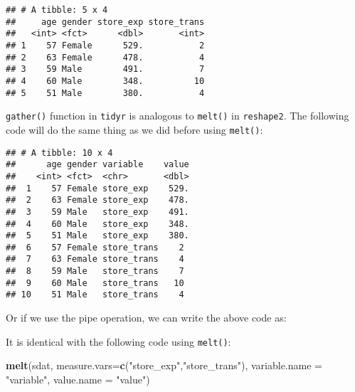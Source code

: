 \documentclass[
]{article}
\newenvironment{Shaded}{\begin{snugshade}}{\end{snugshade}}
\newcommand{\DataTypeTok}[1]{\textcolor[rgb]{0.13,0.29,0.53}{#1}}
\newcommand{\KeywordTok}[1]{\textcolor[rgb]{0.13,0.29,0.53}{\textbf{#1}}}
\newcommand{\NormalTok}[1]{#1}
\newcommand{\OperatorTok}[1]{\textcolor[rgb]{0.81,0.36,0.00}{\textbf{#1}}}
\newcommand{\StringTok}[1]{\textcolor[rgb]{0.31,0.60,0.02}{#1}}
\begin{document}
\begin{verbatim}
## # A tibble: 5 x 4
##     age gender store_exp store_trans
##   <int> <fct>      <dbl>       <int>
## 1    57 Female      529.           2
## 2    63 Female      478.           4
## 3    59 Male        491.           7
## 4    60 Male        348.          10
## 5    51 Male        380.           4
\end{verbatim}

\texttt{gather()} function in \texttt{tidyr} is analogous to
\texttt{melt()} in \texttt{reshape2}. The following code will do the
same thing as we did before using \texttt{melt()}:

\begin{Shaded}
\end{Shaded}

\begin{verbatim}
## # A tibble: 10 x 4
##      age gender variable    value
##    <int> <fct>  <chr>       <dbl>
##  1    57 Female store_exp    529.
##  2    63 Female store_exp    478.
##  3    59 Male   store_exp    491.
##  4    60 Male   store_exp    348.
##  5    51 Male   store_exp    380.
##  6    57 Female store_trans    2 
##  7    63 Female store_trans    4 
##  8    59 Male   store_trans    7 
##  9    60 Male   store_trans   10 
## 10    51 Male   store_trans    4
\end{verbatim}

Or if we use the pipe operation, we can write the above code as:

\begin{Shaded}
\end{Shaded}

It is identical with the following code using \texttt{melt()}:

\begin{Shaded}
\begin{Highlighting}[]
\KeywordTok{melt}\NormalTok{(sdat, }\DataTypeTok{measure.vars=}\KeywordTok{c}\NormalTok{(}\StringTok{"store_exp"}\NormalTok{,}\StringTok{"store_trans"}\NormalTok{),}
            \DataTypeTok{variable.name =} \StringTok{"variable"}\NormalTok{,}
              \DataTypeTok{value.name =} \StringTok{"value"}\NormalTok{)}
\end{Highlighting}
\end{Shaded}
\end{document}
